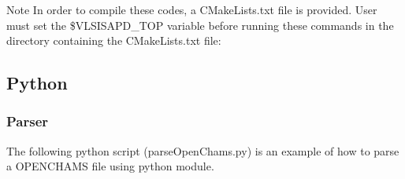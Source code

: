 \begin{DoxyNote}{Note}
In order to compile these codes, a C\-Make\-Lists.\-txt file is provided. User must set the \$\-V\-L\-S\-I\-S\-A\-P\-D\-\_\-\-T\-O\-P variable before running these commands in the directory containing the C\-Make\-Lists.\-txt file\-: 
\begin{DoxyCode}
\end{DoxyCode}

\end{DoxyNote}
\hypertarget{openchams_openChamsPython}{}\subsection{Python}\label{openchams_openChamsPython}
\hypertarget{openchams_openChamsParsePython}{}\subsubsection{Parser}\label{openchams_openChamsParsePython}
The following python script ({\ttfamily parse\-Open\-Chams.\-py}) is an example of how to parse a O\-P\-E\-N\-C\-H\-A\-M\-S file using python module. 
